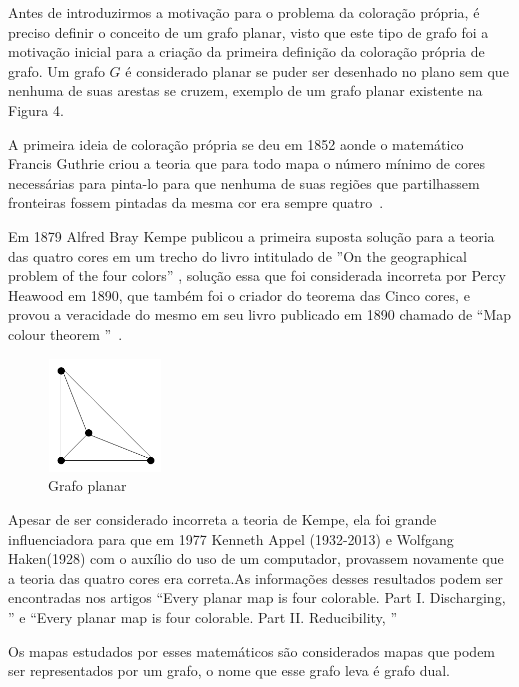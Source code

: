 \documentclass[12pt]{article}
\begin{document}
	Antes de introduzirmos a motivação para o problema da coloração própria, é preciso definir o conceito de um grafo planar, visto que este tipo de grafo foi a motivação inicial para a criação da primeira definição da coloração própria de grafo.
	Um grafo $G$ é considerado planar se puder ser desenhado no plano sem que nenhuma de suas arestas se cruzem, exemplo de um grafo planar existente na Figura 4.
		
	
	A primeira ideia de coloração própria se deu em 1852 aonde o matemático Francis Guthrie criou a teoria que para todo mapa o número mínimo de cores necessárias para pinta-lo para que nenhuma de suas regiões que partilhassem fronteiras fossem pintadas da mesma cor era sempre quatro~\cite{FourColorTheorem}.
	
	
	Em 1879 Alfred Bray Kempe publicou a primeira suposta solução para a teoria das quatro cores em um trecho do livro intitulado de ''On the geographical problem of the four colors''\cite{OnGeographical} , solução essa que foi considerada incorreta por Percy Heawood em 1890, que também foi o criador do teorema das Cinco cores, e provou a veracidade do mesmo em seu livro publicado em 1890 chamado de ``Map colour theorem ''~\cite{MapColor}.
		
	\begin{figure}[!htb]
		\centering
		\includegraphics[width=3cm, height=3cm]{grafoPlanar}
		\caption{Grafo planar}    
	\end{figure}

	Apesar de ser considerado incorreta a teoria de Kempe, ela foi grande influenciadora para que em 1977 Kenneth Appel (1932-2013) e Wolfgang Haken(1928) com o auxílio do uso de um computador, provassem novamente que a teoria das quatro cores era correta.As informações desses resultados podem ser encontradas nos artigos ``Every planar map is four colorable. Part I. Discharging, \cite{EveryFourPart1} '' e 	``Every planar map is four colorable. Part II. Reducibility, \cite{EveryFourPart2} ''
	
	
	Os mapas estudados por esses matemáticos são considerados mapas que podem ser representados por um grafo, o nome que esse grafo leva é grafo dual. 
	
\end{document}
